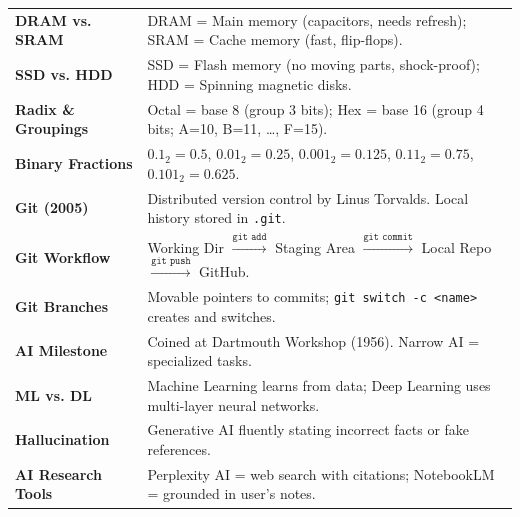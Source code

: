\begin{tcolorbox}[enhanced, colback=LightBg, colframe=CSNavy, boxrule=1pt, arc=2mm, title={\large\bfseries 5-Minute Pre-Exam Cheat Sheet}, fonttitle=\sffamily\bfseries\color{white}, colbacktitle=CSNavy]
\begin{tabular}{@{}l p{11.5cm}@{}}
\textbf{DRAM vs. SRAM} & DRAM = Main memory (capacitors, needs refresh); SRAM = Cache memory (fast, flip-flops). \\
\textbf{SSD vs. HDD} & SSD = Flash memory (no moving parts, shock-proof); HDD = Spinning magnetic disks. \\
\midrule
\textbf{Radix \& Groupings} & Octal = base 8 (group 3 bits); Hex = base 16 (group 4 bits; A=10, B=11, \dots, F=15). \\
\textbf{Binary Fractions} & $0.1_2 = 0.5$, $0.01_2 = 0.25$, $0.001_2 = 0.125$, $0.11_2 = 0.75$, $0.101_2 = 0.625$. \\
\midrule
\textbf{Git (2005)} & Distributed version control by Linus Torvalds. Local history stored in \texttt{.git}. \\
\textbf{Git Workflow} & Working Dir $\xrightarrow{\texttt{git add}}$ Staging Area $\xrightarrow{\texttt{git commit}}$ Local Repo $\xrightarrow{\texttt{git push}}$ GitHub. \\
\textbf{Git Branches} & Movable pointers to commits; \texttt{git switch -c <name>} creates and switches. \\
\midrule
\textbf{AI Milestone} & Coined at Dartmouth Workshop (1956). Narrow AI = specialized tasks. \\
\textbf{ML vs. DL} & Machine Learning learns from data; Deep Learning uses multi-layer neural networks. \\
\textbf{Hallucination} & Generative AI fluently stating incorrect facts or fake references. \\
\textbf{AI Research Tools} & Perplexity AI = web search with citations; NotebookLM = grounded in user's notes. \\
\bottomrule
\end{tabular}
\end{tcolorbox}

\newpage
